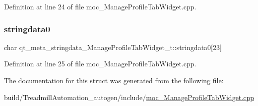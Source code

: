 Definition at line 24 of file moc\+\_\+\+Manage\+Profile\+Tab\+Widget.\+cpp.

\mbox{\label{structqt__meta__stringdata___manage_profile_tab_widget__t_a3a09b5b1788477180e8e12d9c1f50d27}} 
\subsubsection{\texorpdfstring{stringdata0}{stringdata0}}
{\footnotesize\ttfamily char qt\+\_\+meta\+\_\+stringdata\+\_\+\+Manage\+Profile\+Tab\+Widget\+\_\+t\+::stringdata0\mbox{[}23\mbox{]}}



Definition at line 25 of file moc\+\_\+\+Manage\+Profile\+Tab\+Widget.\+cpp.



The documentation for this struct was generated from the following file\+:\begin{DoxyCompactItemize}
\item 
build/\+Treadmill\+Automation\+\_\+autogen/include/\hyperlink{moc___manage_profile_tab_widget_8cpp}{moc\+\_\+\+Manage\+Profile\+Tab\+Widget.\+cpp}\end{DoxyCompactItemize}
